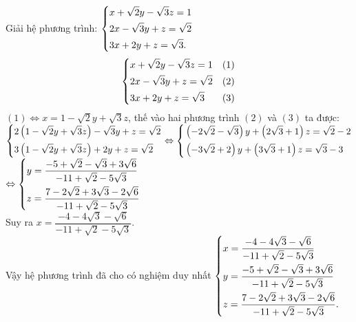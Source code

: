 \begin{ex}%
 Giải hệ phương trình: $\left\{\begin{aligned}& x + \sqrt{2}y - \sqrt{3}z = 1 \\& 2x - \sqrt{3}y + z = \sqrt{2} \\& 3x + 2y + z = \sqrt{3}.\end{aligned}\right.$
 \loigiai
  {
  $$\left\{\begin{aligned}& x + \sqrt{2}y - \sqrt{3}z = 1 & (1) \\& 2x - \sqrt{3}y + z = \sqrt{2} & (2) \\& 3x + 2y + z = \sqrt{3} & (3)\end{aligned}\right.$$ 
  $(1) \Leftrightarrow x = 1 - \sqrt{2}y + \sqrt{3}z$, thế vào hai phương trình $(2)$ và $(3)$ ta được:\\
  \hspace*{0.5cm}$\left\{\begin{aligned}& 2 \left( 1 - \sqrt{2}y + \sqrt{3}z \right) - \sqrt{3}y + z = \sqrt{2} \\& 3 \left( 1 - \sqrt{2}y + \sqrt{3}z \right) +2y + z = \sqrt{2}\end{aligned}\right.
  \Leftrightarrow \left\{\begin{aligned}& \left(-2\sqrt{2} - \sqrt{3} \right)y + \left( 2\sqrt{3} + 1 \right)z = \sqrt{2}- 2 \\& \left(-3\sqrt{2} + 2 \right)y + \left( 3\sqrt{3} + 1 \right)z = \sqrt{3}- 3 \end{aligned}\right.$\\
  $\Leftrightarrow \left\{\begin{aligned}& y = \dfrac{-5 + \sqrt{2} - \sqrt{3} + 3\sqrt{6}}{-11 + \sqrt{2} - 5\sqrt{3}} \\& z = \dfrac{7 - 2\sqrt{2} + 3\sqrt{3} - 2\sqrt{6}}{-11 + \sqrt{2} - 5\sqrt{3}} \end{aligned}\right.$\\
  Suy ra $x = \dfrac{-4 - 4\sqrt{3} - \sqrt{6}}{-11 + \sqrt{2} - 5\sqrt{3}}$.\\
  Vậy hệ phương trình đã cho có nghiệm duy nhất $\left\{\begin{aligned}& x = \dfrac{-4 - 4\sqrt{3} - \sqrt{6}}{-11 + \sqrt{2} - 5\sqrt{3}} \\& y = \dfrac{-5 + \sqrt{2} - \sqrt{3} + 3\sqrt{6}}{-11 + \sqrt{2} - 5\sqrt{3}} \\& z = \dfrac{7 - 2\sqrt{2} + 3\sqrt{3} - 2\sqrt{6}}{-11 + \sqrt{2} - 5\sqrt{3}} .\end{aligned}\right.$
  }
\end{ex}


